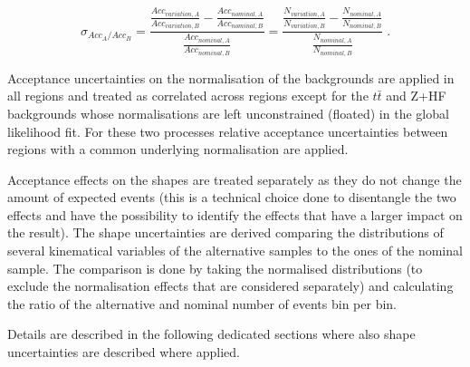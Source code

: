 
\begin{equation}
\sigma_{Acc_{A}/Acc_{B}}= \frac{\frac{Acc_{variation, A}}{Acc_{variation, B}} - \frac{Acc_{nominal, A}}{Acc_{nominal, B}}} {\frac{Acc_{nominal, A}}{Acc_{nominal, B}}} = \frac{\frac{N_{variation, A}}{N_{variation, B}} - \frac{N_{nominal, A}}{N_{nominal, B}}} {\frac{N_{nominal, A}}{N_{nominal, B}}}\;.
\label{eq:relative_acceptance_unc}
\end{equation}

Acceptance uncertainties on the normalisation of the backgrounds are applied in all regions and treated as correlated across regions except for the $t\bar{t}$ and Z+HF backgrounds whose normalisations are left unconstrained (floated) in the global likelihood fit. For these two processes relative acceptance uncertainties between regions with a common underlying normalisation are applied. 

Acceptance effects on the shapes are treated separately as they do not change the amount of expected events (this is a technical choice done to disentangle the two effects and have the possibility to identify the effects that have a larger impact on the result). The shape uncertainties are derived comparing the distributions of several kinematical variables of the alternative samples to the ones of the nominal sample. The comparison is done by taking the normalised distributions (to exclude the normalisation effects that are considered separately) and calculating the ratio of the alternative and nominal number of events bin per bin. 

Details are described in the following dedicated sections where also shape uncertainties are described where applied.


